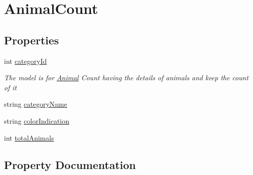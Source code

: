 \hypertarget{classWildLifeTracker_1_1Models_1_1AnimalCount}{}\section{Animal\+Count}
\label{classWildLifeTracker_1_1Models_1_1AnimalCount}
\subsection*{Properties}
\begin{DoxyCompactItemize}
\item 
int \hyperlink{classWildLifeTracker_1_1Models_1_1AnimalCount_a423f91c56dc35040d661cfbe357f7c78}{category\+Id}
\begin{DoxyCompactList}\small\item\em The model is for \hyperlink{classWildLifeTracker_1_1Models_1_1Animal}{Animal} Count having the details of animals and keep the count of it \end{DoxyCompactList}\item 
string \hyperlink{classWildLifeTracker_1_1Models_1_1AnimalCount_a1eca787c85e1bc45b49bbd281d4106fd}{category\+Name}
\item 
string \hyperlink{classWildLifeTracker_1_1Models_1_1AnimalCount_a0ecdefcc99a4b41b1ef3a04167756366}{color\+Indication}
\item 
int \hyperlink{classWildLifeTracker_1_1Models_1_1AnimalCount_af2a3c76f434001a3f47c287cc16f04ff}{total\+Animals}
\end{DoxyCompactItemize}


\subsection{Property Documentation}
\mbox{\label{classWildLifeTracker_1_1Models_1_1AnimalCount_a423f91c56dc35040d661cfbe357f7c78}} 
